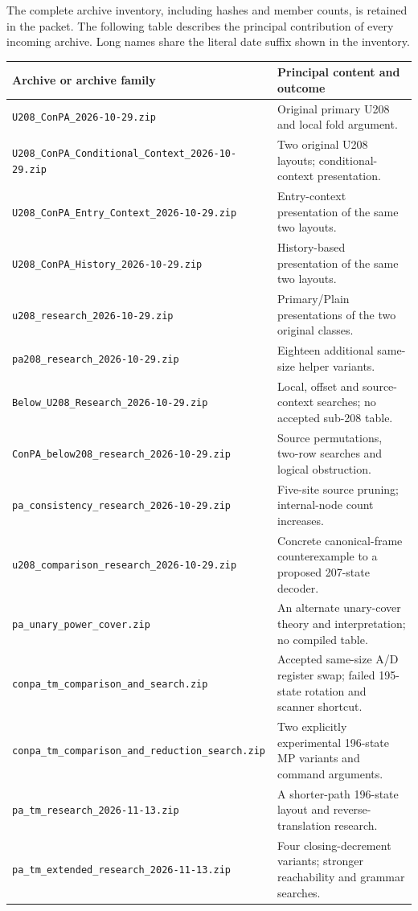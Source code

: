 \documentclass[11pt,letterpaper]{article}
\newcommand{\file}[1]{\texttt{\nolinkurl{#1}}}
\begin{document}
The complete archive inventory, including hashes and member counts, is retained
in the packet. The following
table describes the principal contribution of every incoming archive.
Long names share the literal date suffix shown in the inventory.

\small
\begin{longtable}{@{}p{5.9cm}p{8.0cm}@{}}
\toprule
Archive or archive family & Principal content and outcome \\
\midrule\endhead
\file{U208_ConPA_2026-10-29.zip} & Original primary U208 and local fold argument.\\
\file{U208_ConPA_Conditional_Context_2026-10-29.zip} & Two original U208 layouts; conditional-context presentation.\\
\file{U208_ConPA_Entry_Context_2026-10-29.zip} & Entry-context presentation of the same two layouts.\\
\file{U208_ConPA_History_2026-10-29.zip} & History-based presentation of the same two layouts.\\
\file{u208_research_2026-10-29.zip} & Primary/Plain presentations of the two original classes.\\
\file{pa208_research_2026-10-29.zip} & Eighteen additional same-size helper variants.\\
\file{Below_U208_Research_2026-10-29.zip} & Local, offset and source-context searches; no accepted sub-208 table.\\
\file{ConPA_below208_research_2026-10-29.zip} & Source permutations, two-row searches and logical obstruction.\\
\file{pa_consistency_research_2026-10-29.zip} & Five-site source pruning; internal-node count increases.\\
\file{u208_comparison_research_2026-10-29.zip} & Concrete canonical-frame counterexample to a proposed 207-state decoder.\\
\file{pa_unary_power_cover.zip} & An alternate unary-cover theory and interpretation; no compiled table.\\
\file{conpa_tm_comparison_and_search.zip} & Accepted same-size A/D register swap; failed 195-state rotation and scanner shortcut.\\
\file{conpa_tm_comparison_and_reduction_search.zip} & Two explicitly experimental 196-state MP variants and command arguments.\\
\file{pa_tm_research_2026-11-13.zip} & A shorter-path 196-state layout and reverse-translation research.\\
\file{pa_tm_extended_research_2026-11-13.zip} & Four closing-decrement variants; stronger reachability and grammar searches.\\

\end{longtable}
\end{document}
